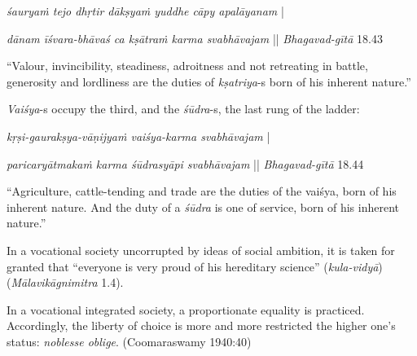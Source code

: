 \begin{myquote}
{{\sl śauryaṁ tejo dhṛtir dākṣyaṁ yuddhe cāpy apalāyanam}} |

{\sl dānam īśvara-bhāvaś ca kṣātraṁ karma svabhāvajam} || {\sl Bhagavad-gītā} 18.43
\end{myquote}

\begin{myquote}
“Valour, invincibility, steadiness, adroitness and not retreating in battle, generosity and lordliness are the duties of {\sl kṣatriya}-s born of his inherent nature.”
\end{myquote}

{\sl Vaiśya}-s occupy the third, and the {\sl śūdra}-s, the last rung of the ladder: 

\begin{myquote}
{{\sl kṛṣi-gaurakṣya-vāṇijyaṁ vaiśya-karma svabhāvajam}} |

{\sl paricaryātmakaṁ karma śūdrasyāpi svabhāvajam} || {\sl Bhagavad-gītā} 18.44
\end{myquote}

\begin{myquote}
“Agriculture, cattle-tending and trade are the duties of the vaiśya, born of his inherent nature. And the duty of a {\sl śūdra} is one of service, born of his inherent nature.”
\end{myquote}

\newpage

In a vocational society uncorrupted by ideas of social ambition, it is taken for granted that “everyone is very proud of his hereditary science” ({\sl kula-vidyā}) ({\sl Mālavikāgnimitra} 1.4).

In a vocational integrated society, a proportionate equality is practiced. Accordingly, the liberty of choice is more and more restricted the higher one’s status: {\sl noblesse oblige}. (Coomaraswamy 1940:40)

